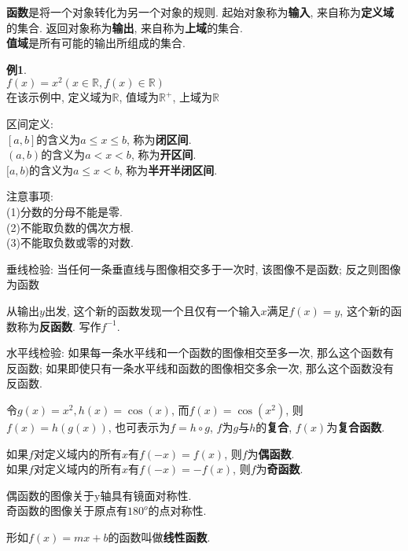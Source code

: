 \documentclass[UTF8, fontset=ubuntu]{ctexart}
\begin{document}
\textbf{函数}是将一个对象转化为另一个对象的规则. 起始对象称为\textbf{输入}, 来自称为\textbf{定义域}的集合. 返回对象称为\textbf{输出}, 来自称为\textbf{上域}的集合.\\
\textbf{值域}是所有可能的输出所组成的集合.

\textbf{例1}.\\
$f(x)=x^2(x\in\mathbb{R}, f(x)\in\mathbb{R})$\\
在该示例中, 定义域为$\mathbb{R}$, 值域为$\mathbb{R}^+$, 上域为$\mathbb{R}$

区间定义:\\
$[a,b]$的含义为$a\leqslant x\leqslant b$, 称为\textbf{闭区间}.\\
$(a,b)$的含义为$a<x<b$, 称为\textbf{开区间}.\\
$[a,b)$的含义为$a\leqslant x<b$, 称为\textbf{半开半闭区间}.

注意事项:\\
(1)分数的分母不能是零.\\
(2)不能取负数的偶次方根.\\
(3)不能取负数或零的对数.

垂线检验: 当任何一条垂直线与图像相交多于一次时, 该图像不是函数; 反之则图像为函数

从输出$y$出发, 这个新的函数发现一个且仅有一个输入$x$满足$f(x)=y$, 这个新的函数称为\textbf{反函数}. 写作$f^{-1}$.

水平线检验: 如果每一条水平线和一个函数的图像相交至多一次, 那么这个函数有反函数; 如果即使只有一条水平线和函数的图像相交多余一次, 那么这个函数没有反函数.

令$g(x)=x^2, h(x)=\cos(x)$, 而$f(x)=\cos(x^2)$, 则$f(x)=h(g(x))$, 也可表示为$f=h\circ g$, $f$为$g$与$h$的\textbf{复合}, $f(x)$为\textbf{复合函数}.

如果$f$对定义域内的所有$x$有$f(-x)=f(x)$, 则$f$为\textbf{偶函数}.\\
如果$f$对定义域内的所有$x$有$f(-x)=-f(x)$, 则$f$为\textbf{奇函数}.

偶函数的图像关于y轴具有镜面对称性.\\
奇函数的图像关于原点有$180^o$的点对称性.

形如$f(x)=mx+b$的函数叫做\textbf{线性函数}.
\end{document}

